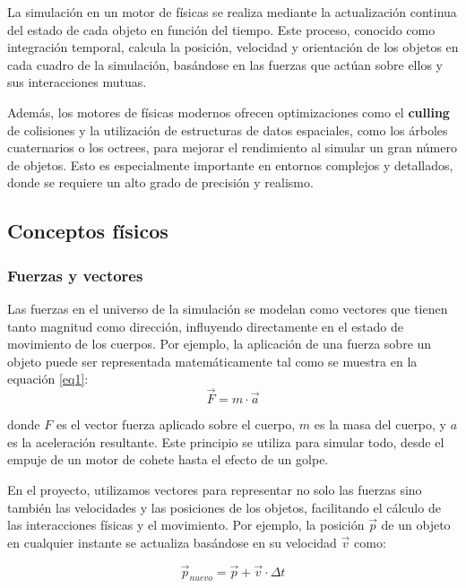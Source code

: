 La simulación en un motor de físicas se realiza mediante la actualización continua del estado de cada objeto en función del tiempo. Este proceso, conocido como integración temporal, calcula la posición, velocidad y orientación de los objetos en cada cuadro de la simulación, basándose en las fuerzas que actúan sobre ellos y sus interacciones mutuas.

Además, los motores de físicas modernos ofrecen optimizaciones como el \textbf{culling} de colisiones y la utilización de estructuras de datos espaciales, como los árboles cuaternarios o los octrees, para mejorar el rendimiento al simular un gran número de objetos. Esto es especialmente importante en entornos complejos y detallados, donde se requiere un alto grado de precisión y realismo.

\subsection{Conceptos físicos}

\subsubsection{Fuerzas y vectores}
Las fuerzas en el universo de la simulación se modelan como vectores que tienen tanto magnitud como dirección, influyendo directamente en el estado de movimiento de los cuerpos. Por ejemplo, la aplicación de una fuerza sobre un objeto puede ser representada matemáticamente tal como se muestra en la equación \ref{eq1}:
\begin{equation}
\label{eq1}
    \vec{F} = m \cdot \vec{a}
\end{equation}


donde \(F\) es el vector fuerza aplicado sobre el cuerpo, \(m\) es la masa del cuerpo, y \(a\) es la aceleración resultante. Este principio se utiliza para simular todo, desde el empuje de un motor de cohete hasta el efecto de un golpe.

En el proyecto, utilizamos vectores para representar no solo las fuerzas sino también las velocidades y las posiciones de los objetos, facilitando el cálculo de las interacciones físicas y el movimiento. Por ejemplo, la posición \(\vec{p}\) de un objeto en cualquier instante se actualiza basándose en su velocidad \(\vec{v}\) como:

\begin{equation}
\label{eq2}
    \vec{p}_{nuevo} = \vec{p} + \vec{v} \cdot \Delta t
\end{equation}

